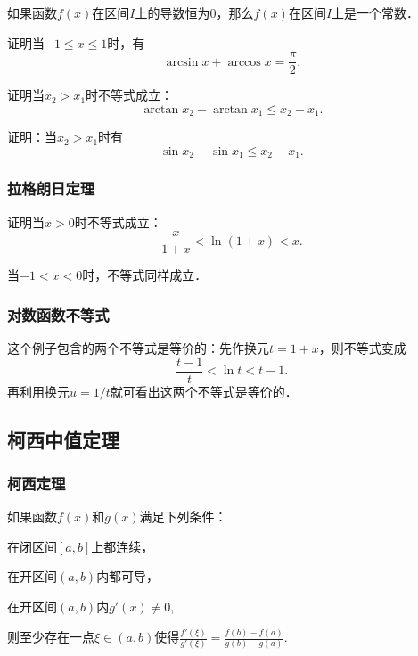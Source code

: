 \documentclass[14pt,notheorems,leqno,xcolor={rgb}]{beamer} %
\begin{document}
\begin{frame}
\begin{corollary}
如果函数$f(x)$在区间$I$上的导数恒为$0$，那么$f(x)$在区间$I$上是一个常数．
\end{corollary}
\vpause
\begin{example}
证明当$-1\le x \le 1$时，有
$$\arcsin x + \arccos x = \dfrac{\pi}2.$$
\end{example}
\end{frame}

\begin{frame}
\begin{example}
证明当$x_2>x_1$时不等式成立：
$$\arctan x_2-\arctan x_1 \le x_2-x_1.$$
\end{example}
\vpause
\begin{exercise}
证明：当$x_2>x_1$时有
$$\sin x_2-\sin x_1 \le x_2-x_1.$$
\end{exercise}
\end{frame}

\begin{frame}
\frametitle{拉格朗日定理}
\begin{example}
证明当$x>0$时不等式成立：
$$\dfrac{x}{1+x}<\ln(1+x)<x.$$
\end{example}
\pause
\begin{remark*}
当$-1<x<0$时，不等式同样成立．
\end{remark*}
\end{frame}

\begin{sframe}
\frametitle{对数函数不等式}
\begin{remark*}
这个例子包含的两个不等式是等价的：先作换元$t=1+x$，则不等式变成
\[ \frac{t-1}{t} < \ln t < t - 1 . \]
再利用换元$u=1/t$就可看出这两个不等式是等价的．
\end{remark*}
\end{sframe}

\subsection{柯西中值定理}

\begin{frame}
\frametitle{柯西定理}
\begin{theorem*}
如果函数$f(x)$和$g(x)$满足下列条件：
\begin{enumskip}
\item 在闭区间$[a,b]$上都连续，
\item 在开区间$(a,b)$内都可导，
\item 在开区间$(a,b)$内$g'(x)\neq0$,
\end{enumskip}
则至少存在一点$\xi\in(a,b)$使得$\frac{f'(\xi)}{g'(\xi)}=\frac{f(b)-f(a)}{g(b)-g(a)}$.
\end{theorem*}
\end{frame}
\end{document}
